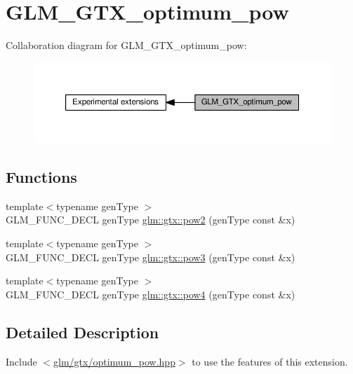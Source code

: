 \hypertarget{group__gtx__optimum__pow}{}\section{G\+L\+M\+\_\+\+G\+T\+X\+\_\+optimum\+\_\+pow}
\label{group__gtx__optimum__pow}
Collaboration diagram for G\+L\+M\+\_\+\+G\+T\+X\+\_\+optimum\+\_\+pow\+:
\nopagebreak
\begin{figure}[H]
\begin{center}
\leavevmode
\includegraphics[width=350pt]{dc/dd0/group__gtx__optimum__pow}
\end{center}
\end{figure}
\subsection*{Functions}
\begin{DoxyCompactItemize}
\item 
{\footnotesize template$<$typename gen\+Type $>$ }\\G\+L\+M\+\_\+\+F\+U\+N\+C\+\_\+\+D\+E\+CL gen\+Type \hyperlink{group__gtx__optimum__pow_ga19aaff3213bf23bdec3ef124ace237e9}{glm\+::gtx\+::pow2} (gen\+Type const \&x)
\item 
{\footnotesize template$<$typename gen\+Type $>$ }\\G\+L\+M\+\_\+\+F\+U\+N\+C\+\_\+\+D\+E\+CL gen\+Type \hyperlink{group__gtx__optimum__pow_ga35689d03cd434d6ea819f1942d3bf82e}{glm\+::gtx\+::pow3} (gen\+Type const \&x)
\item 
{\footnotesize template$<$typename gen\+Type $>$ }\\G\+L\+M\+\_\+\+F\+U\+N\+C\+\_\+\+D\+E\+CL gen\+Type \hyperlink{group__gtx__optimum__pow_gacef0968763026e180e53e735007dbf5a}{glm\+::gtx\+::pow4} (gen\+Type const \&x)
\end{DoxyCompactItemize}


\subsection{Detailed Description}
Include $<$\hyperlink{optimum__pow_8hpp}{glm/gtx/optimum\+\_\+pow.\+hpp}$>$ to use the features of this extension.


